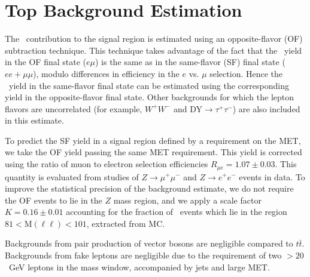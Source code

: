 \section{Top Background Estimation}
\label{sec:topbkg}

The \ttbar\ contribution to the signal region is estimated using an opposite-flavor (OF) subtraction technique.
This technique takes advantage of the fact that the \ttbar\ yield in the 
OF final state ($e\mu$) is the same as in the same-flavor (SF) final state
($ee+\mu\mu$), modulo differences in efficiency in the $e$ vs. $\mu$ selection.
Hence the \ttbar\ yield in the same-flavor final state can be estimated
using the corresponding yield in the opposite-flavor final state. 
Other backgrounds for which the lepton flavors are
uncorrelated (for example, $W^+W^-$ and DY$\rightarrow \tau^+\tau^-$) are also included in
this estimate.

To predict the SF yield in a signal region defined by a requirement on the MET, we take the 
OF yield passing the same MET requirement. This yield is corrected using the ratio of
muon to electron selection efficiencies $R_{\mu e}=1.07 \pm 0.03$.
This quantity is evaluated from studies of $Z\to\mu^+\mu^-$ and $Z\to e^+e^-$
events in data. To improve the statistical precision
of the background estimate, we do not require the OF events to lie in the $Z$ mass region,
and we apply a scale factor $K=0.16 \pm 0.01$ accounting for the fraction of \ttbar\ events
which lie in the region $81 < \mathrm{M(\ell\ell)} < 101$\GeVcc, extracted from MC.

Backgrounds from pair production of vector bosons are negligible compared to $t\bar{t}$.
Backgrounds from fake leptons are negligible due to the requirement of two \pt$ > 20$~GeV leptons
in the \Z mass window, accompanied by jets and large MET.
